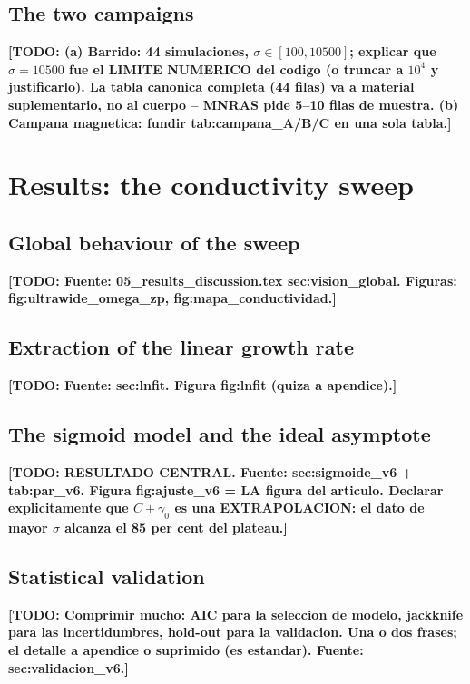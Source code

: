 \documentclass[fleqn,usenatbib]{mnras}
\newcommand{\todo}[1]{\textbf{[TODO: #1]}}
\begin{document}
\subsection{The two campaigns}
\label{sec:campaigns}

\todo{(a) Barrido: 44 simulaciones, $\sigma\in[100,10500]$; explicar que
$\sigma=10500$ fue el LIMITE NUMERICO del codigo (o truncar a $10^4$ y
justificarlo). La tabla canonica completa (44 filas) va a material
suplementario, no al cuerpo -- MNRAS pide 5--10 filas de muestra.
(b) Campana magnetica: fundir tab:campana\_A/B/C en una sola tabla.}

\section{Results: the conductivity sweep}
\label{sec:results}

\subsection{Global behaviour of the sweep}
\label{sec:overview}
\todo{Fuente: 05\_results\_discussion.tex sec:vision\_global.
Figuras: fig:ultrawide\_omega\_zp, fig:mapa\_conductividad.}

\subsection{Extraction of the linear growth rate}
\label{sec:fit}
\todo{Fuente: sec:lnfit. Figura fig:lnfit (quiza a apendice).}

\subsection{The sigmoid model and the ideal asymptote}
\label{sec:sigmoid}
\todo{RESULTADO CENTRAL. Fuente: sec:sigmoide\_v6 + tab:par\_v6.
Figura fig:ajuste\_v6 = LA figura del articulo.
Declarar explicitamente que $C+\gamma_0$ es una EXTRAPOLACION: el dato de mayor
$\sigma$ alcanza el 85 per cent del plateau.}

\subsection{Statistical validation}
\label{sec:validation}
\todo{Comprimir mucho: AIC para la seleccion de modelo, jackknife para las
incertidumbres, hold-out para la validacion. Una o dos frases; el detalle a
apendice o suprimido (es estandar). Fuente: sec:validacion\_v6.}
\end{document}
